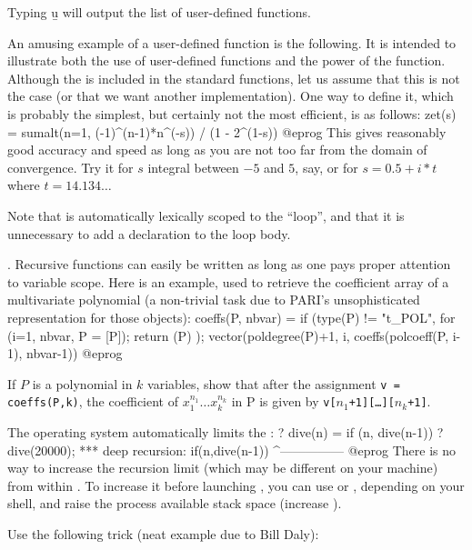 Typing \b{u} will output the list of user-defined functions.

An amusing example of a user-defined function is the following. It is
intended to illustrate both the use of user-defined functions and the power
of the  function. Although the  is
included in the standard functions, let us assume that this is not the case
(or that we want another implementation). One way to define it, which is
probably the simplest, but certainly not the most efficient, is as
follows:
\bprog
zet(s) = sumalt(n=1, (-1)^(n-1)*n^(-s)) / (1 - 2^(1-s))
@eprog
\noindent This gives reasonably good accuracy and speed as long as you are
not too far from the domain of convergence. Try it for $s$ integral between
$-5$ and $5$, say, or for $s=0.5+i*t$ where $t=14.134\dots$

Note that  is automatically lexically scoped to the 
``loop'', and that it is unnecessary to add a  declaration to the
loop body.

. Recursive functions can easily
be written as long as one pays proper attention to variable scope. Here is an
example, used to retrieve the coefficient array of a multivariate polynomial
(a non-trivial task due to PARI's unsophisticated representation for those
objects): 
\bprog
coeffs(P, nbvar) =
{
  if (type(P) != "t_POL",
    for (i=1, nbvar, P = [P]);
    return (P)
  );
  vector(poldegree(P)+1, i, coeffs(polcoeff(P, i-1), nbvar-1))
}
@eprog

\noindent If $P$ is a polynomial in $k$ variables, show that after the
assignment {\tt v = coeffs(P,k)}, the coefficient of $x_1^{n_1}\dots
x_k^{n_k}$ in P is given by {\tt v[$n_1$+1][\dots][$n_k$+1]}.

The operating system automatically limits the :
\bprog
? dive(n) = if (n, dive(n-1))
? dive(20000);
  ***   deep recursion: if(n,dive(n-1))
                        ^---------------
@eprog
There is no way to increase the recursion limit (which may be different on
your machine) from within . To increase it before launching ,
you can use  or , depending on your shell, and raise
the process available stack space (increase ).

Use the following trick (neat example due to Bill Daly):

